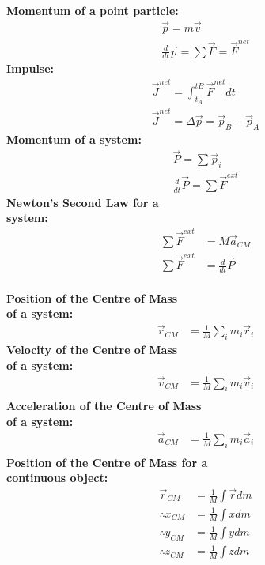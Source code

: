 \newpage
\begin{importantEquations}
\medskip
\begin{multicols}{2}
\textbf{Momentum of a point particle:}
\begin{align*}
\vec p = m\vec v \\
\frac{d}{dt}\vec p = \sum \vec F = \vec F^{net}
\end{align*}
\textbf{Impulse:}
\begin{align*}
\vec J^{net} = \int_{t_A}^{tB} \vec F^{net} dt \\
\vec J^{net} = \Delta \vec p = \vec p_B - \vec p_A
\end{align*}
\textbf{Momentum of a system:}
\begin{align*}
\vec P = \sum \vec p_i \\
\frac{d}{dt}\vec P = \sum \vec F^{ext}
\end{align*}
\textbf{Newton's Second Law for a \\ system:}
\begin{align*}
\sum \vec F^{ext} &= M \vec a_{CM}\\
\sum \vec F^{ext} &=\frac{d}{dt} \vec P
\end{align*}
\columnbreak
\\
\textbf{Position of the Centre of Mass \\ of a system:}
\begin{align*}
\vec r_{CM} &=\frac{1}{M}\sum_i m_i\vec r_i 
\end{align*}
\textbf{Velocity of the Centre of Mass \\ of a system:}
\begin{align*}
\vec v_{CM} &= \frac{1}{M}\sum_i m_i\vec v_i \\
\end{align*}
\textbf{Acceleration of the Centre of Mass \\ of a system:}
\begin{align*}
\vec a_{CM} &=  \frac{1}{M}\sum_i m_i\vec a_i \\
\end{align*}
\textbf{Position of the Centre of Mass for a \\ continuous object:}
\begin{align*}
\vec r_{CM} &=\frac{1}{M}\int \vec r dm\\
\therefore x_{CM} &= \frac{1}{M}\int x dm\\
\therefore y_{CM} &=  \frac{1}{M}\int y dm\\
\therefore z_{CM} &=  \frac{1}{M}\int z dm
\end{align*}
\medskip
\end{multicols}
\end{importantEquations}


